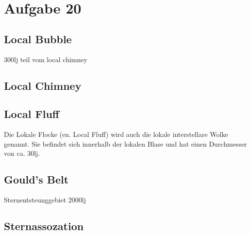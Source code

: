 \section{Aufgabe 20}
\subsection{Local Bubble}
300lj
teil vom local chimney
\subsection{Local Chimney}
\subsection{Local Fluff}
Die Lokale Flocke (en. Local Fluff) wird auch die lokale interstellare Wolke genannt. Sie befindet sich innerhalb der lokalen Blase und hat einen Durchmesser von ca. 30lj.
\subsection{Gould's Belt}
Sternentsteunggebiet 2000lj
\subsection{Sternassozation}
